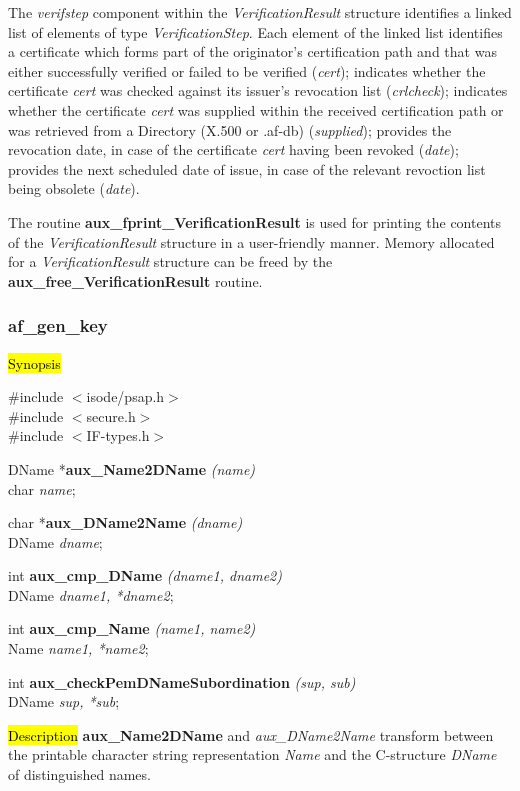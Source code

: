 The {\em verifstep} component within the {\em VerificationResult} structure identifies a 
linked list of elements of type {\em VerificationStep}.
Each element of the linked list
\bi
\m identifies a certificate which forms part of the originator's certification path and
that was either successfully verified or failed to be verified
({\em cert});
\m indicates whether the certificate {\em cert} was checked against its issuer's revocation 
list ({\em crlcheck});
\m indicates whether the certificate {\em cert} was supplied within the received certification
path or was retrieved from a Directory (X.500 or .af-db) ({\em supplied});
\m provides the revocation date, in case of the certificate {\em cert} having been revoked
({\em date});
\m provides the next scheduled date of issue, in case of the relevant revoction list being 
obsolete ({\em date}).
\ei

The routine {\bf aux\_fprint\_VerificationResult} is used for printing the contents of the
{\em VerificationResult} structure in a user-friendly manner. Memory allocated for
a {\em VerificationResult} structure can be freed by the {\bf aux\_free\_VerificationResult}
routine.

\subsubsection{af\_gen\_key}
\label{aux_name}
\hl{Synopsis}

\#include $<$isode/psap.h$>$ \\
\#include $<$secure.h$>$ \\
\#include $<$IF-types.h$>$ 

DName *{\bf aux\_Name2DName} {\em (name)} \\
char {\em *name};

char *{\bf aux\_DName2Name} {\em (dname)} \\
DName {\em *dname};

int {\bf aux\_cmp\_DName} {\em  (dname1, dname2)} \\
DName {\em *dname1, *dname2};

int {\bf aux\_cmp\_Name} {\em  (name1, name2)} \\
Name {\em *name1, *name2};

int {\bf aux\_checkPemDNameSubordination} {\em  (sup, sub)} \\
DName {\em *sup, *sub};

\hl{Description}
{\bf aux\_Name2DName} and {\em aux\_DName2Name} transform between
the printable character string representation {\em Name} and the
C-structure {\em DName} of distinguished names. 

